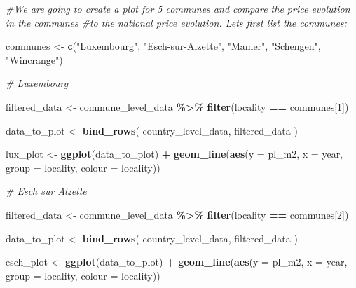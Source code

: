 \documentclass[
]{article}
\newenvironment{Shaded}{\begin{snugshade}}{\end{snugshade}}
\newcommand{\AttributeTok}[1]{\textcolor[rgb]{0.13,0.29,0.53}{#1}}
\newcommand{\CommentTok}[1]{\textcolor[rgb]{0.56,0.35,0.01}{\textit{#1}}}
\newcommand{\DecValTok}[1]{\textcolor[rgb]{0.00,0.00,0.81}{#1}}
\newcommand{\FunctionTok}[1]{\textcolor[rgb]{0.13,0.29,0.53}{\textbf{#1}}}
\newcommand{\NormalTok}[1]{#1}
\newcommand{\OtherTok}[1]{\textcolor[rgb]{0.56,0.35,0.01}{#1}}
\newcommand{\SpecialCharTok}[1]{\textcolor[rgb]{0.81,0.36,0.00}{\textbf{#1}}}
\newcommand{\StringTok}[1]{\textcolor[rgb]{0.31,0.60,0.02}{#1}}
\begin{document}
\begin{Shaded}
\begin{Highlighting}[]
\CommentTok{\#We are going to create a plot for 5 communes and compare the price evolution in the communes}
\CommentTok{\#to the national price evolution. Let\textquotesingle{}s first list the communes:}

\NormalTok{communes }\OtherTok{\textless{}{-}} \FunctionTok{c}\NormalTok{(}\StringTok{"Luxembourg"}\NormalTok{,}
              \StringTok{"Esch{-}sur{-}Alzette"}\NormalTok{,}
              \StringTok{"Mamer"}\NormalTok{,}
              \StringTok{"Schengen"}\NormalTok{,}
              \StringTok{"Wincrange"}\NormalTok{)}

\CommentTok{\# Luxembourg}

\NormalTok{filtered\_data }\OtherTok{\textless{}{-}}\NormalTok{ commune\_level\_data }\SpecialCharTok{\%\textgreater{}\%}
  \FunctionTok{filter}\NormalTok{(locality }\SpecialCharTok{==}\NormalTok{ communes[}\DecValTok{1}\NormalTok{])}

\NormalTok{data\_to\_plot }\OtherTok{\textless{}{-}} \FunctionTok{bind\_rows}\NormalTok{(}
\NormalTok{  country\_level\_data,}
\NormalTok{  filtered\_data}
\NormalTok{)}

\NormalTok{lux\_plot }\OtherTok{\textless{}{-}} \FunctionTok{ggplot}\NormalTok{(data\_to\_plot) }\SpecialCharTok{+}
  \FunctionTok{geom\_line}\NormalTok{(}\FunctionTok{aes}\NormalTok{(}\AttributeTok{y =}\NormalTok{ pl\_m2,}
                \AttributeTok{x =}\NormalTok{ year,}
                \AttributeTok{group =}\NormalTok{ locality,}
                \AttributeTok{colour =}\NormalTok{ locality))}


\CommentTok{\# Esch sur Alzette}

\NormalTok{filtered\_data }\OtherTok{\textless{}{-}}\NormalTok{ commune\_level\_data }\SpecialCharTok{\%\textgreater{}\%}
  \FunctionTok{filter}\NormalTok{(locality }\SpecialCharTok{==}\NormalTok{ communes[}\DecValTok{2}\NormalTok{])}

\NormalTok{data\_to\_plot }\OtherTok{\textless{}{-}} \FunctionTok{bind\_rows}\NormalTok{(}
\NormalTok{  country\_level\_data,}
\NormalTok{  filtered\_data}
\NormalTok{)}

\NormalTok{esch\_plot }\OtherTok{\textless{}{-}} \FunctionTok{ggplot}\NormalTok{(data\_to\_plot) }\SpecialCharTok{+}
  \FunctionTok{geom\_line}\NormalTok{(}\FunctionTok{aes}\NormalTok{(}\AttributeTok{y =}\NormalTok{ pl\_m2,}
                \AttributeTok{x =}\NormalTok{ year,}
                \AttributeTok{group =}\NormalTok{ locality,}
                \AttributeTok{colour =}\NormalTok{ locality))}


\end{Highlighting}
\end{Shaded}
\end{document}

